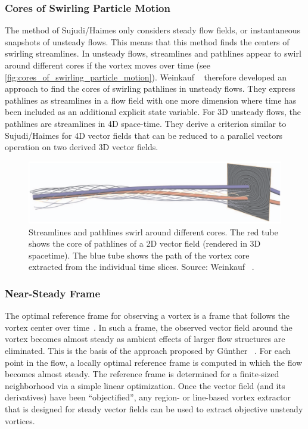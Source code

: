 \subsubsection{Cores of Swirling Particle Motion} %
\label{ssub:cores_of_swirling_particle_motion}
%
The method of Sujudi/Haimes only considers steady flow fields, or instantaneous
snapshots of unsteady flows.
%
This means that this method finds the centers of swirling streamlines.
%
In unsteady flows, streamlines and pathlines appear to swirl around different
cores if the vortex moves over time (see
\autoref{fig:cores_of_swirling_particle_motion}).
%
Weinkauf \etal~\cite{Weinkauf2007} therefore developed an approach to find the
cores of swirling pathlines in unsteady flows.
%
They express pathlines as streamlines in a flow field with one more dimension
where time has been included as an additional explicit state variable.
%
For \ac{3D} unsteady flows, the pathlines are streamlines in \ac{4D} space-time.
%
They derive a criterion similar to Sujudi/Haimes for \ac{4D} vector fields that
can be reduced to a parallel vectors operation on two derived \ac{3D} vector
fields.
%
\begin{figure}[t]
    \centering
    \includegraphics[width=\textwidth]{figures/pathline_streamline_core.png}
    \caption{Streamlines and pathlines swirl around different cores. The red
    tube shows the core of pathlines of a \ac{2D} vector field (rendered in
    \ac{3D} spacetime). The blue tube shows the path of the vortex core
    extracted from the individual time slices. Source: Weinkauf
    \etal~\cite{Weinkauf2007}.}
    \label{fig:cores_of_swirling_particle_motion}
\end{figure}
%
%
\subsubsection{Near-Steady Frame} %
\label{ssub:near_steady_frame}
%
The optimal reference frame for observing a vortex is a frame that follows the
vortex center over time~\cite{Robinson1991}.
%
In such a frame, the observed vector field around the vortex becomes almost
steady as ambient effects of larger flow structures are eliminated.
%
This is the basis of the approach proposed by G\"unther
\etal~\cite{Guenther2017}.
%
For each point in the flow, a locally optimal reference frame is computed in
which the flow becomes almost steady.
%
The reference frame is determined for a finite-sized neighborhood via a simple
linear optimization.
%
Once the vector field (and its derivatives) have been ``objectified'', any
region- or line-based vortex extractor that is designed for steady vector fields
can be used to extract objective unsteady vortices.
%
%
%
